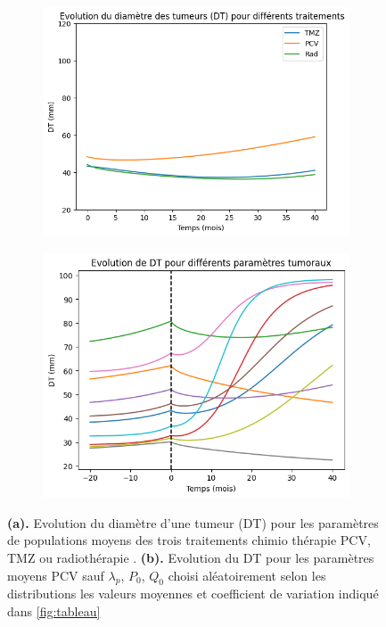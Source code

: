 \documentclass[12pt]{article}
\begin{document}
\begin{figure}
    \centering
    \begin{subfigure}[t]{0.45\textwidth}
        \centering
        \includegraphics[width=\linewidth]{Image/evolution_TD_param_moy.png} 
        \caption{} \label{fig:evol_moy}
    \end{subfigure}
    \hfill
    \begin{subfigure}[t]{0.45\textwidth}
        \centering
        \includegraphics[width=\linewidth]{Image/ex_traj.png} 
        \caption{} \label{fig:rand_traj}
    \end{subfigure}

    \caption{\textbf{(a).} Evolution du diamètre d'une tumeur (DT) pour les paramètres de populations moyens des trois traitements chimio thérapie PCV, TMZ ou radiothérapie \cite{}. \textbf{(b).} Evolution du DT pour les paramètres moyens PCV sauf $\lambda_{p}$, $P_{0}$, $Q_{0}$ choisi aléatoirement selon les distributions les valeurs moyennes et coefficient de variation indiqué dans \ref{fig:tableau} }
\end{figure}
\end{document}
